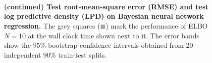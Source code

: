 %
\newpage
\begin{figure}[h]
  \centering
  \vspace{0.05in}\\
  \vspace{0.05in}\\
  \vspace{0.05in}\\
  \caption{\textbf{(continued) Test root-mean-square error (RMSE) and test log predictive density (LPD) on Bayesian neural network regression.}
    The grey squares (\textcolor{darkgrey}{\(\blacksquare\)}) mark the performance of ELBO \(N=10\) at the wall clock time shown next to it.
  The error bands show the 95\% bootstrap confidence intervals obtained from 20 independent 90\% train-test splits.}
\end{figure}

